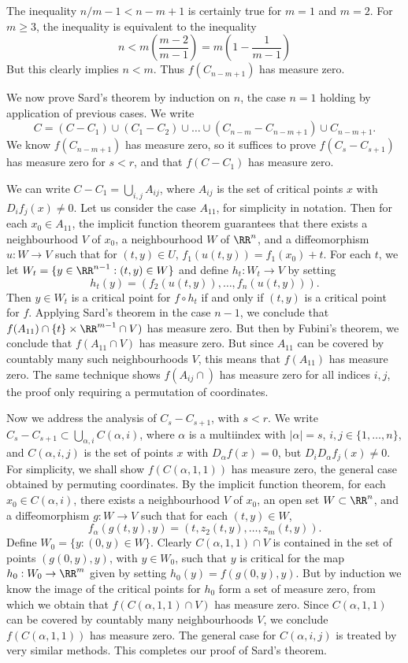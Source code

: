The inequality $n/m - 1 < n - m + 1$ is certainly true for $m = 1$ and $m = 2$. For $m \geq 3$, the inequality is equivalent to the inequality
%
\[ n < m \left( \frac{m - 2}{m - 1} \right) = m \left( 1 - \frac{1}{m - 1} \right) \]
%
But this clearly implies $n < m$. Thus $f(C_{n-m+1})$ has measure zero.

We now prove Sard's theorem by induction on $n$, the case $n = 1$ holding by application of previous cases. We write
%
\[ C = (C - C_1) \cup (C_1 - C_2) \cup \dots \cup (C_{n-m} - C_{n-m+1}) \cup C_{n-m+1}. \]
%
We know $f(C_{n-m+1})$ has measure zero, so it suffices to prove $f(C_s - C_{s+1})$ has measure zero for $s < r$, and that $f(C - C_1)$ has measure zero.

We can write $C - C_1 = \bigcup_{i,j} A_{ij}$, where $A_{ij}$ is the set of critical points $x$ with $D_i f_j(x) \neq 0$. Let us consider the case $A_{11}$, for simplicity in notation. Then for each $x_0 \in A_{11}$, the implicit function theorem guarantees that there exists a neighbourhood $V$ of $x_0$, a neighbourhood $W$ of $\RR^n$, and a diffeomorphism $u: W \to V$ such that for $(t,y) \in U$, $f_1(u(t,y)) = f_1(x_0) + t$. For each $t$, we let $W_t = \{ y \in \RR^{n-1}: (t,y) \in W \}$ and define $h_t: W_t \to V$ by setting
%
\[ h_t(y) = (f_2(u(t,y)), \dots, f_n(u(t,y))). \]
%
Then $y \in W_t$ is a critical point for $f \circ h_t$ if and only if $(t,y)$ is a critical point for $f$. Applying Sard's theorem in the case $n-1$, we conclude that $f(A_{11}) \cap \{ t \} \times \RR^{m-1} \cap V)$ has measure zero. But then by Fubini's theorem, we conclude that $f(A_{11} \cap V)$ has measure zero. But since $A_{11}$ can be covered by countably many such neighbourhoods $V$, this means that $f(A_{11})$ has measure zero. The same technique shows $f(A_{ij} \cap)$ has measure zero for all indices $i,j$, the proof only requiring a permutation of coordinates.

Now we address the analysis of $C_s - C_{s+1}$, with $s < r$. We write $C_s - C_{s+1} \subset \bigcup_{\alpha,i} C(\alpha,i)$, where $\alpha$ is a multiindex with $|\alpha| = s$, $i,j \in \{ 1, \dots, n \}$, and $C(\alpha,i,j)$ is the set of points $x$ with $D_\alpha f(x) = 0$, but $D_i D_\alpha f_j(x) \neq 0$. For simplicity, we shall show $f(C(\alpha,1,1))$ has measure zero, the general case obtained by permuting coordinates. By the implicit function theorem, for each $x_0 \in C(\alpha,i)$, there exists a neighbourhood $V$ of $x_0$, an open set $W \subset \RR^n$, and a diffeomorphism $g: W \to V$ such that for each $(t,y) \in W$,
%
\[ f_\alpha(g(t,y),y) = (t, z_2(t,y), \dots, z_m(t,y)). \]
%
Define $W_0 = \{ y : (0,y) \in W \}$. Clearly $C(\alpha,1,1) \cap V$ is contained in the set of points $(g(0,y),y)$, with $y \in W_0$, such that $y$ is critical for the map $h_0 : W_0 \to \RR^m$ given by setting $h_0(y) = f(g(0,y),y)$. But by induction we know the image of the critical points for $h_0$ form a set of measure zero, from which we obtain that $f(C(\alpha,1,1) \cap V)$ has measure zero. Since $C(\alpha,1,1)$ can be covered by countably many neighbourhoods $V$, we conclude $f(C(\alpha,1,1))$ has measure zero. The general case for $C(\alpha,i,j)$ is treated by very similar methods. This completes our proof of Sard's theorem.


